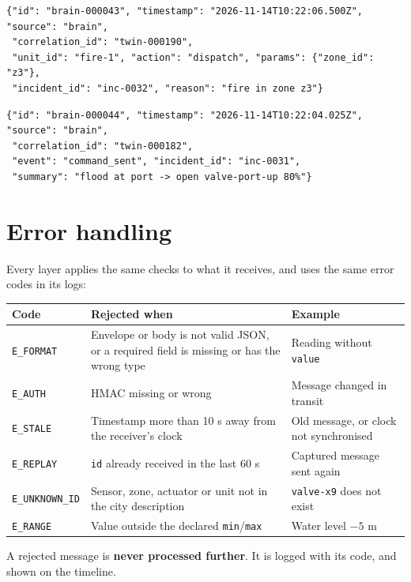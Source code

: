 \documentclass[11pt,a4paper]{article}
\newcommand{\code}[1]{\texttt{#1}}
\begin{document}
\begin{lstlisting}[caption={Body of a unit dispatch}]
{"id": "brain-000043", "timestamp": "2026-11-14T10:22:06.500Z", "source": "brain",
 "correlation_id": "twin-000190",
 "unit_id": "fire-1", "action": "dispatch", "params": {"zone_id": "z3"},
 "incident_id": "inc-0032", "reason": "fire in zone z3"}
\end{lstlisting}

\begin{lstlisting}[caption={Body of a timeline event}]
{"id": "brain-000044", "timestamp": "2026-11-14T10:22:04.025Z", "source": "brain",
 "correlation_id": "twin-000182",
 "event": "command_sent", "incident_id": "inc-0031",
 "summary": "flood at port -> open valve-port-up 80%"}
\end{lstlisting}

\section{Error handling}
\label{sec:errors}

Every layer applies the same checks to what it receives, and uses the same error codes in its logs:

\begin{tabularx}{\linewidth}{@{}l Y Y@{}}
\toprule
\textbf{Code} & \textbf{Rejected when} & \textbf{Example} \\
\midrule
\code{E\_FORMAT} & Envelope or body is not valid JSON, or a required field is missing or has the wrong type & Reading without \code{value} \\
\code{E\_AUTH} & HMAC missing or wrong & Message changed in transit \\
\code{E\_STALE} & Timestamp more than 10 s away from the receiver's clock & Old message, or clock not synchronised \\
\code{E\_REPLAY} & \code{id} already received in the last 60 s & Captured message sent again \\
\code{E\_UNKNOWN\_ID} & Sensor, zone, actuator or unit not in the city description & \code{valve-x9} does not exist \\
\code{E\_RANGE} & Value outside the declared \code{min}/\code{max} & Water level $-5$ m \\
\bottomrule
\end{tabularx}

\medskip
A rejected message is \textbf{never processed further}. It is logged with its code, and shown on the timeline.
\end{document}
